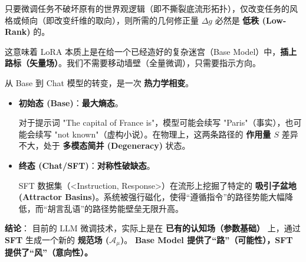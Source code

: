 \begin{theorem}[微调微扰定理]
    只要微调任务不破坏原有的世界观逻辑（即不撕裂底流形拓扑），仅改变任务的风格或倾向（即改变纤维的取向），则所需的几何修正量 $\Delta g$ 必然是 \textbf{低秩 (Low-Rank)} 的。
\end{theorem}

这意味着 LoRA 本质上是在给一个已经造好的复杂迷宫（Base Model）中，\textbf{插上路标（矢量场）}。我们不需要移动墙壁（全量微调），只需要指示方向。


从 Base 到 Chat 模型的转变，是一次 \textbf{热力学相变}。

\begin{itemize}
    \item   \textbf{初始态 (Base)}：\textbf{最大熵态}。

    对于提示词 "The capital of France is"，模型可能会续写 "Paris"（事实），也可能会续写 "not known"（虚构小说）。在物理上，这两条路径的 \textbf{作用量 $S$} 差异不大，处于 \textbf{多模态简并 (Degeneracy)} 状态。

    \item   \textbf{终态 (Chat/SFT)}：\textbf{对称性破缺态}。

    SFT 数据集（<Instruction, Response>）在流形上挖掘了特定的 \textbf{吸引子盆地 (Attractor Basins)}。系统被强行磁化，使得“遵循指令”的路径势能大幅降低，而“胡言乱语”的路径势能壁垒无限升高。
\end{itemize}

\textbf{结论}：
目前的 LLM 微调技术，实际上是在 \textbf{已有的认知场（参数基础）} 上，通过 \textbf{SFT} 生成一个新的 \textbf{规范场 ($\mathcal{A}_\mu$)}。
\textbf{Base Model 提供了“路”（可能性），SFT 提供了“风”（意向性）。}
